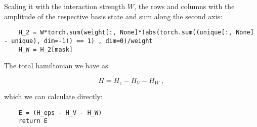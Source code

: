Scaling it with the interaction strength $W$, the rows and columns with the amplitude of the respective basis state and sum along the second axis:

\begin{verbatim} 
    H_2 = W*torch.sum(weight[:, None]*(abs(torch.sum((unique[:, None] - unique), dim=-1)) == 1) , dim=0)/weight
    H_W = H_2[mask]
\end{verbatim}

The total hamiltonian we have as

\[
  H = H_{\varepsilon} - H_V - H_W \; ,
\]

which we can calculate directly:

\begin{verbatim} 
    E = (H_eps - H_V - H_W)
    return E
\end{verbatim}


